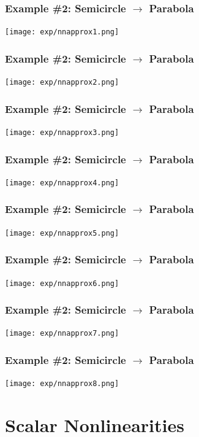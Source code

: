 \documentclass{beamer}
\begin{document}
\begin{frame}
  \frametitle{Example \#2: Semicircle $\rightarrow$ Parabola}

  \texttt{[image: exp/nnapprox1.png]}
\end{frame}

\begin{frame}
  \frametitle{Example \#2: Semicircle $\rightarrow$ Parabola}

  \texttt{[image: exp/nnapprox2.png]}
\end{frame}

\begin{frame}
  \frametitle{Example \#2: Semicircle $\rightarrow$ Parabola}

  \texttt{[image: exp/nnapprox3.png]}
\end{frame}

\begin{frame}
  \frametitle{Example \#2: Semicircle $\rightarrow$ Parabola}

  \texttt{[image: exp/nnapprox4.png]}
\end{frame}

\begin{frame}
  \frametitle{Example \#2: Semicircle $\rightarrow$ Parabola}

  \texttt{[image: exp/nnapprox5.png]}
\end{frame}

\begin{frame}
  \frametitle{Example \#2: Semicircle $\rightarrow$ Parabola}

  \texttt{[image: exp/nnapprox6.png]}
\end{frame}

\begin{frame}
  \frametitle{Example \#2: Semicircle $\rightarrow$ Parabola}

  \texttt{[image: exp/nnapprox7.png]}
\end{frame}


\begin{frame}
  \frametitle{Example \#2: Semicircle $\rightarrow$ Parabola}

  \texttt{[image: exp/nnapprox8.png]}
\end{frame}


\section[Nonlinearities]{Scalar Nonlinearities}
\setcounter{subsection}{1}
\end{document}
